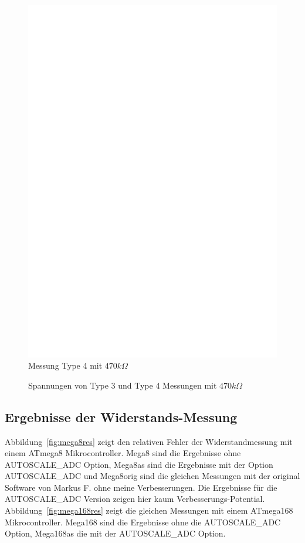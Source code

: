 \begin{figure}[H]
 \centering
 \includegraphics[]{../FIG/ResistormessH2.eps}
 \caption{Messung Type 4 mit \(470k\Omega\) }
\label{fig:RH2mes}
\end{figure}

\begin{figure}[H]
\centering

\caption{Spannungen von Type 3 und Type 4 Messungen mit \(470k\Omega\) }
\label{fig:RHv}
\end{figure}

\subsection{Ergebnisse der Widerstands-Messung}
Abbildung~\ref{fig:mega8res} zeigt den relativen Fehler der Widerstandmessung mit einem ATmega8
Mikrocontroller. Mega8 sind die Ergebnisse ohne AUTOSCALE\_ADC Option,
Mega8as sind die Ergebnisse mit der Option AUTOSCALE\_ADC und
Mega8orig sind die gleichen Messungen mit der original Software von Markus F. ohne meine Verbesserungen.
Die Ergebnisse f\"ur die AUTOSCALE\_ADC Version zeigen hier kaum Verbesserungs-Potential.
Abbildung~\ref{fig:mega168res} zeigt die gleichen Messungen mit einem ATmega168 Mikrocontroller.
Mega168 sind die Ergebnisse ohne die AUTOSCALE\_ADC Option, Mega168as die mit der
 AUTOSCALE\_ADC Option.

